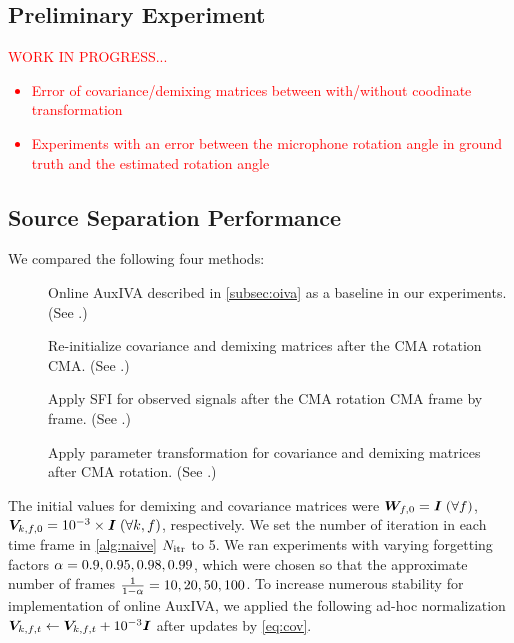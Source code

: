 \documentclass[sip,biber]{now-journal}
\newcommand{\todo}[1]{\textcolor{red}{#1}}
\begin{document}
\subsection{Preliminary Experiment}
\todo{%
  WORK IN PROGRESS...
\begin{itemize}
  \item Error of covariance/demixing matrices between with/without coodinate transformation%
  \item Experiments with an error between the microphone rotation angle in ground truth and the estimated rotation angle%
\end{itemize}
}

\subsection{Source Separation Performance}

We compared the following four methods:
\begin{description}
  \item[\NaiveIVA] Online AuxIVA described in \cref{subsec:oiva} as a baseline in our experiments. (See .)
  \item[\ResetIVA] Re-initialize covariance and demixing matrices after the CMA rotation CMA. (See .)
  \item[\RTObs] Apply SFI for observed signals after the CMA rotation CMA frame by frame. (See .)
  \item[\RTCov] Apply parameter transformation for covariance and demixing matrices after CMA rotation.  (See .)
\end{description}

The initial values for demixing and covariance matrices were
$\bm{W} _{f,0} = \bm{I}\; (\forall f)$, $\bm{V} _{k,f,0} = 10^{-3}\times\bm{I}\; (\forall k, f)$, respectively.
We set the number of iteration in each time frame in \cref{alg:naive} $N _{\mathrm{itr}}$ to 5.
We ran experiments with varying forgetting factors $\alpha = 0.9, 0.95, 0.98, 0.99$, which were chosen so that the approximate number of frames $\frac{1}{1 - \alpha} = 10, 20, 50, 100$.
To increase numerous stability for implementation of online AuxIVA,
we applied the following ad-hoc normalization $\cov _{\src,\ft} \gets \cov _{\src,\ft} + 10 ^{-3} \Eye$ after updates by \eqref{eq:cov}.
\end{document}
